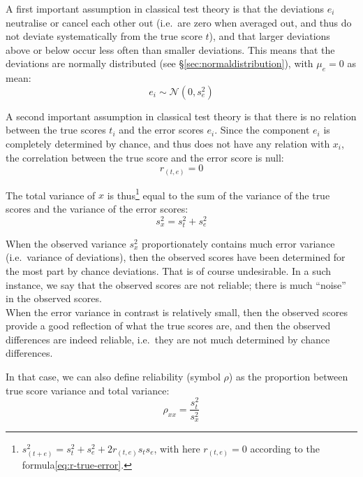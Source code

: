 \documentclass[
]{book}
\begin{document}
A first important assumption in classical test theory is that
the deviations \(e_i\) neutralise or cancel each other out (i.e.~are zero when averaged
out, and thus do not deviate systematically from the true score \(t\)), and
that larger deviations above or below occur less often than smaller
deviations. This means that the deviations are normally distributed (see
§\ref{sec:normaldistribution}), with \(\mu_e=0\) as mean:
\begin{equation}
  \label{eq:normal-error}
  e_i \sim \mathcal{N}(0,s^2_e)
\end{equation}

A second important assumption in classical test theory is that there
is no relation between the true scores \(t_i\) and the error scores \(e_i\).
Since the component \(e_i\) is completely determined by chance, and thus does not
have any relation with \(x_i\), the correlation between the true score and
the error score is null:
\begin{equation}
  \label{eq:r-true-error}
  r_{(t,e)} = 0
\end{equation}

The total variance of \(x\) is thus\footnote{\(s^2_{(t+e)} = s^2_t + s^2_e + 2  r_{(t,e)} s_t s_e\), with here \(r_{(t,e)}=0\) according to the formula\eqref{eq:r-true-error}.} equal to the sum of the variance
of the true scores and the variance of the error scores:
\begin{equation}
  \label{eq:var-true-error}
  s^2_x = s^2_t + s^2_e
\end{equation}

When the observed variance \(s^2_x\) proportionately contains much
error variance (i.e.~variance of deviations), then the observed scores
have been determined for the most part by chance deviations. That is of course
undesirable. In a such instance, we say that the observed scores
are not reliable; there is much ``noise'' in the observed scores.\\
When the error variance in contrast is relatively small, then
the observed scores provide a good reflection of what the true scores are,
and then the observed differences are indeed reliable, i.e.~they
are not much determined by chance differences.

In that case, we can also define reliability (symbol \(\rho\)) as the
proportion between true score variance and total variance:\\
\begin{equation}
  \label{eq:rho-reliability}
  \rho_{xx} = \frac{s^2_t}{s^2_x}
\end{equation}
\end{document}
